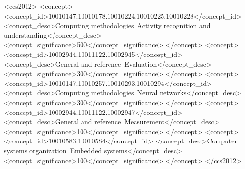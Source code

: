 \documentclass[sigconf]{acmart}
\begin{document}
\begin{CCSXML}
<ccs2012>
   <concept>
       <concept_id>10010147.10010178.10010224.10010225.10010228</concept_id>
       <concept_desc>Computing methodologies~Activity recognition and understanding</concept_desc>
       <concept_significance>500</concept_significance>
       </concept>
   <concept>
       <concept_id>10002944.10011122.10002945</concept_id>
       <concept_desc>General and reference~Evaluation</concept_desc>
       <concept_significance>300</concept_significance>
       </concept>
   <concept>
       <concept_id>10010147.10010257.10010293.10010294</concept_id>
       <concept_desc>Computing methodologies~Neural networks</concept_desc>
       <concept_significance>300</concept_significance>
       </concept>
   <concept>
       <concept_id>10002944.10011122.10002947</concept_id>
       <concept_desc>General and reference~Measurement</concept_desc>
       <concept_significance>100</concept_significance>
       </concept>
   <concept>
       <concept_id>10010583.10010584</concept_id>
       <concept_desc>Computer systems organization~Embedded systems</concept_desc>
       <concept_significance>100</concept_significance>
       </concept>
 </ccs2012>
\end{CCSXML}



\maketitle
\end{document}
